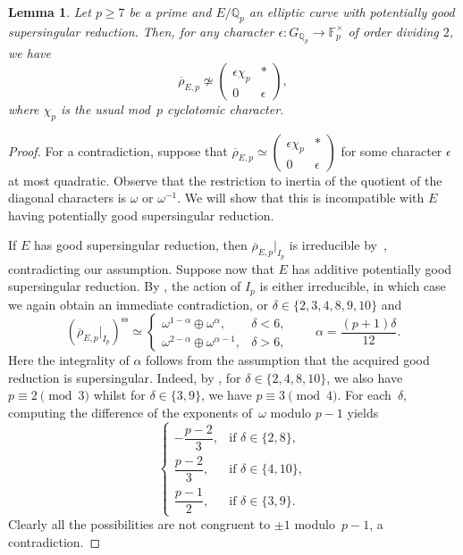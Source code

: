 \documentclass[12pt]{amsart}
\numberwithin{equation}{section}
\newtheorem{lemma}[equation]{Lemma}
\theoremstyle{definition}
\newcommand{\F}{\mathbb{F}}
\newcommand{\Q}{\mathbb{Q}}
\newcommand{\rhobar}{{\overline{\rho}}}
\begin{document}
\begin{lemma}\label{lem:l=prep}
Let $p\geq7$ be a prime and $E/\Q_p$ an elliptic curve
with potentially good supersingular reduction. Then, for any character $\epsilon : G_{\Q_p} \to \F_p^\times$ of order dividing $2$, we have
\[
 \rhobar_{E,p}\not\simeq
 \begin{pmatrix}
  \epsilon\chi_p&*\\
  0&\epsilon
 \end{pmatrix},
\]
 where $\chi_p$ is the usual mod~$p$ cyclotomic character.
\end{lemma}
\begin{proof} For a contradiction, suppose that
$\overline{\rho}_{E,p}\simeq
 \left(\begin{smallmatrix}
  \epsilon\chi_p&*\\
  0&\epsilon
 \end{smallmatrix}\right)$ 
for some character $\epsilon$ at most quadratic.
Observe that the restriction to inertia of the quotient of the diagonal characters is $\omega$ or $\omega^{-1}$. We will show that this is incompatible with $E$ having potentially good supersingular reduction. 

If \(E\) has good supersingular reduction, then
\(\overline{\rho}_{E,p}|_{I_p}\) is irreducible  
by~\cite[Proposition~12]{Serre2}, contradicting our assumption. 
Suppose now that \(E\) has additive potentially good supersingular
reduction.
By \cite[Proposition~2 and Lemme 2]{Kraus1997}, the action of $I_p$ is
either irreducible, in which case we again obtain an immediate
contradiction, or \(\delta \in\{2,3,4,8,9,10\}\) and
\begin{equation} \label{eq:Ipss2}
 \left(\overline{\rho}_{E,p}|_{I_p}\right)^{\mathrm{ss}}
 \simeq
 \begin{cases}
   \omega^{1-\alpha}\oplus\omega^\alpha,
       & \delta<6,\\[2mm]
   \omega^{2-\alpha}\oplus\omega^{\alpha-1},
       & \delta>6,
 \end{cases}
 \qquad
 \alpha=\frac{(p+1)\delta}{12}.
\end{equation}
Here the integrality of \(\alpha\) follows from the assumption that
the acquired good reduction is supersingular. Indeed, by \cite[Lemme 1]{Kraus1997}, for \(\delta\in\{2,4,8,10\}\), we also have $p \equiv 2 \pmod{3}$ whilst for \(\delta\in\{3,9\}\), we have $p \equiv 3 \pmod{4}$.
For each~$\delta$, computing the difference of the exponents of~$\omega$ modulo $p-1$ yields
\[
\begin{cases}
-\dfrac{p-2}{3}, & \text{if } \delta\in\{2,8\},\\[2mm]
 \dfrac{p-2}{3}, & \text{if } \delta\in\{4,10\},\\[2mm]
 \dfrac{p-1}{2}, & \text{if } \delta\in\{3,9\}.
\end{cases}
\]
Clearly all the possibilities are not congruent to $\pm 1$ modulo~$p-1$, a contradiction.
\end{proof}
\end{document}
